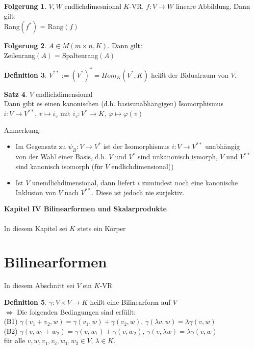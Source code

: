\documentclass[10pt,a4paper,numbers=endperiod]{scrartcl}
\theoremstyle{definition}
\newtheorem{satz}{Satz}[section]
\newtheorem{defi}[satz]{Definition}
\newtheorem{folg}[satz]{Folgerung}
\begin{document}
\begin{folg}
	$V, W$ endlichdimesnional $K$-VR, $f: V \rightarrow W$ lineare Abbildung. Dann gilt:\\
	Rang$(f^*)$ = Rang$(f)$
\end{folg}

\begin{folg}
	$A \in M(m \times n, K)$. Dann gilt:\\
	Zeilenrang$(A)$ = Spaltenrang$(A)$ 
\end{folg}

\begin{defi}
	$V^{**} := (V^*)^* = Hom_K(V^*, K)$ heißt der Bidualraum von $V$.
\end{defi}

\begin{satz}
	$V$ endlichdimensional\\
	Dann gibt es einen kanonischen (d.h. basisunabhängigen) Isomorphismus $i: V \rightarrow V^{**}$, $v \mapsto i_v$ mit $i_v: V^* \rightarrow K$, $\varphi \mapsto \varphi(v)$ 
\end{satz}

Anmerkung: \begin{itemize}
	\item Im Gegensatz zu $\psi_B : V \rightarrow V^*$ ist der Isomorphismus $i: V \rightarrow V^{**}$ unabhängig von der Wahl einer Basis, d.h. $V$ und $V^*$ sind unkanonisch ismorph, $V$ und $V^{**}$ sind kanonisch isomorph (für $V$ endlichdimensional))
	\item Ist $V$ unendlichdimensional, dann liefert $i$ zumindest noch eine kanonische Inklusion von $V$ nach $V^{**}$. Diese ist jedoch nie surjektiv.\\
\end{itemize}
\newpage
\textbf{\Large Kapitel IV Bilinearformen und Skalarprodukte}\\
\\ 
In diesem Kapitel sei $K$ stets ein Körper

\section{Bilinearformen} 
In diesem Abschnitt sei $V$ ein $K$-VR 

\begin{defi}
	$\gamma: V \times V  \rightarrow K$ heißt eine Bilinearform auf $V$\\
	$\Leftrightarrow$ Die folgenden Bedingungen sind erfüllt:\\
	(B1) $\gamma(v_1+v_2, w) = \gamma(v_1,w) + \gamma(v_2, w)$, $\gamma(\lambda v, w) = \lambda \gamma(v,w)$\\
	(B2) $\gamma (v, w_1+w_2) = \gamma(v, w_1) + \gamma(v,w_2)$, $\gamma(v,\lambda w) = \lambda \gamma(v,w)$\\
	für alle $v,w,v_1,v_2,w_1,w_2 \in V$, $\lambda \in K$.
\end{defi}
\end{document}
